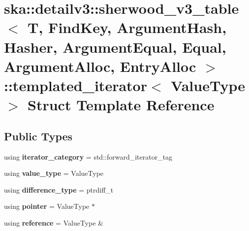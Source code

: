 \section{ska\+:\+:detailv3\+:\+:sherwood\+\_\+v3\+\_\+table$<$ T, Find\+Key, Argument\+Hash, Hasher, Argument\+Equal, Equal, Argument\+Alloc, Entry\+Alloc $>$\+:\+:templated\+\_\+iterator$<$ Value\+Type $>$ Struct Template Reference}
\label{structska_1_1detailv3_1_1sherwood__v3__table_1_1templated__iterator}
\subsection*{Public Types}
\begin{DoxyCompactItemize}
\item 
using {\bfseries iterator\+\_\+category} = std\+::forward\+\_\+iterator\+\_\+tag\label{structska_1_1detailv3_1_1sherwood__v3__table_1_1templated__iterator_a11da233839fedaeb7c04de3b9ceba01c}

\item 
using {\bfseries value\+\_\+type} = Value\+Type\label{structska_1_1detailv3_1_1sherwood__v3__table_1_1templated__iterator_ae5beca4c34ba34f8f72db61e70c32768}

\item 
using {\bfseries difference\+\_\+type} = ptrdiff\+\_\+t\label{structska_1_1detailv3_1_1sherwood__v3__table_1_1templated__iterator_a5ead70f703f844442fc7d6f99501009b}

\item 
using {\bfseries pointer} = Value\+Type $\ast$\label{structska_1_1detailv3_1_1sherwood__v3__table_1_1templated__iterator_a86b20ddef58240ee2425e940042468ce}

\item 
using {\bfseries reference} = Value\+Type \&\label{structska_1_1detailv3_1_1sherwood__v3__table_1_1templated__iterator_a713c0031feacd2b96445864d1640b3a6}

\end{DoxyCompactItemize}
